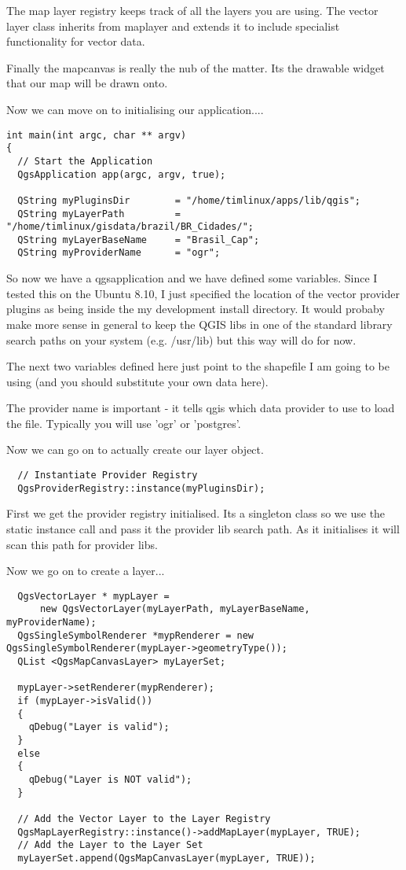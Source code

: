 The map layer registry keeps track of all the layers you are using. The
vector layer class inherits from maplayer and extends it to include
specialist functionality for vector data.

Finally the mapcanvas is really the nub of the matter. Its the drawable
widget that our map will be drawn onto.

Now we can move on to initialising our application....

\begin{verbatim}
int main(int argc, char ** argv)
{
  // Start the Application
  QgsApplication app(argc, argv, true);

  QString myPluginsDir        = "/home/timlinux/apps/lib/qgis";
  QString myLayerPath         = "/home/timlinux/gisdata/brazil/BR_Cidades/";
  QString myLayerBaseName     = "Brasil_Cap";
  QString myProviderName      = "ogr";

\end{verbatim}

So now we have a qgsapplication and we have defined some variables. Since I
tested this on the Ubuntu 8.10, I just specified the location of the vector
provider plugins as being inside the my development install directory. It
would probaby make more sense in general to keep the QGIS libs in one of the
standard library search paths on your system (e.g. /usr/lib) but this way
will do for now.

The next two variables defined here just point to the shapefile I am going to
be using (and you should substitute your own data here).

The provider name is important - it tells qgis which data provider to use to
load the file. Typically you will use 'ogr' or 'postgres'.

Now we can go on to actually create our layer object.

\begin{verbatim}
  // Instantiate Provider Registry
  QgsProviderRegistry::instance(myPluginsDir);
\end{verbatim}

First we get the provider registry initialised. Its a singleton class so we
use the static instance call and pass it the provider lib search path. As it
initialises it will scan this path for provider libs.

Now we go on to create a layer...

\begin{verbatim}
  QgsVectorLayer * mypLayer =
      new QgsVectorLayer(myLayerPath, myLayerBaseName, myProviderName);
  QgsSingleSymbolRenderer *mypRenderer = new
QgsSingleSymbolRenderer(mypLayer->geometryType());
  QList <QgsMapCanvasLayer> myLayerSet;

  mypLayer->setRenderer(mypRenderer);
  if (mypLayer->isValid())
  {
    qDebug("Layer is valid");
  }
  else
  {
    qDebug("Layer is NOT valid");
  }

  // Add the Vector Layer to the Layer Registry
  QgsMapLayerRegistry::instance()->addMapLayer(mypLayer, TRUE);
  // Add the Layer to the Layer Set
  myLayerSet.append(QgsMapCanvasLayer(mypLayer, TRUE));

\end{verbatim}

